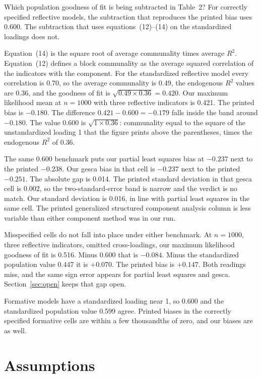 \documentclass[11pt]{article}
\begin{document}
Which population goodness of fit is being subtracted in Table~2? For
correctly specified reflective models, the subtraction that reproduces the
printed bias uses 0.600. The subtraction that uses equations~(12)--(14) on
the standardized loadings does not.

Equation~(14) is the square root of average communality times average
$R^2$. Equation~(12) defines a block communality as the average squared
correlation of the indicators with the component. For the standardized
reflective model every correlation is 0.70, so the average communality is
0.49, the endogenous $R^2$ values are 0.36, and the goodness of fit is
$\sqrt{0.49 \times 0.36} = 0.420$. Our maximum likelihood mean at
$n=1000$ with three reflective indicators is 0.421. The printed bias is
$-0.180$. The difference $0.421 - 0.600 = -0.179$ falls inside the band
around $-0.180$. The value 0.600 is $\sqrt{1 \times 0.36}$: communality
equal to the square of the unstandardized loading 1 that the figure prints
above the parentheses, times the endogenous $R^2$ of 0.36.

The same 0.600 benchmark puts our partial least squares bias at $-0.237$
next to the printed $-0.238$. Our gesca bias in that cell is $-0.237$ next
to the printed $-0.251$. The absolute gap is 0.014. The printed standard
deviation in that gesca cell is 0.002, so the two-standard-error band is
narrow and the verdict is no match. Our standard deviation is 0.016, in
line with partial least squares in the same cell. The printed generalized
structured component analysis column is less variable than either component
method was in our run.

Misspecified cells do not fall into place under either benchmark. At
$n=1000$, three reflective indicators, omitted cross-loadings, our maximum
likelihood goodness of fit is 0.516. Minus 0.600 that is $-0.084$. Minus
the standardized population value 0.447 it is $+0.070$. The printed bias is
$+0.147$. Both readings miss, and the same sign error appears for partial
least squares and gesca. Section~\ref{sec:open} keeps that gap open.

Formative models have a standardized loading near 1, so 0.600 and the
standardized population value 0.599 agree. Printed biases in the correctly
specified formative cells are within a few thousandths of zero, and our
biases are as well.

\section{Assumptions}
\label{sec:assumptions}
\end{document}
